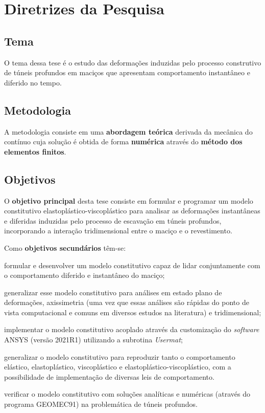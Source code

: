 \chapter{Diretrizes da Pesquisa}

\section{Tema}

O tema dessa tese é o estudo das deformações induzidas pelo processo construtivo de túneis profundos em maciços que apresentam comportamento instantâneo e diferido no tempo.

\section{Metodologia}

A metodologia consiste em uma \textbf{abordagem teórica} derivada da mecânica do contínuo cuja solução é obtida de forma \textbf{numérica} através do \textbf{método dos elementos finitos}.

\section{Objetivos}

O \textbf{objetivo principal} desta tese consiste em formular e programar um modelo constitutivo elastoplástico-viscoplástico para analisar as deformações instantâneas e diferidas induzidas pelo processo de escavação em túneis profundos, incorporando a interação tridimensional entre o maciço e o revestimento.

Como \textbf{objetivos secundários} têm-se:

\begin{alineas}
	 

	\item formular e desenvolver um modelo constitutivo capaz de lidar conjuntamente com o comportamento diferido e instantâneo do maciço;
	
	\item generalizar esse modelo constitutivo para análises em estado plano de deformações, axissimetria (uma vez que essas análises são rápidas do ponto de vista computacional e comuns em diversos estudos na literatura) e tridimensional;
	
	\item implementar o modelo constitutivo acoplado através da customização do \textit{software} ANSYS (versão 2021R1) utilizando a subrotina \textit{Usermat};
	
	\item generalizar o modelo constitutivo para reproduzir tanto o comportamento elástico, elastoplástico, viscoplástico e elastoplástico-viscoplástico, com a possibilidade de implementação de diversas leis de comportamento.
	
	\item verificar o modelo constitutivo com soluções analíticas e numéricas (através do programa GEOMEC91) na problemática de túneis profundos.
	
\end{alineas}

